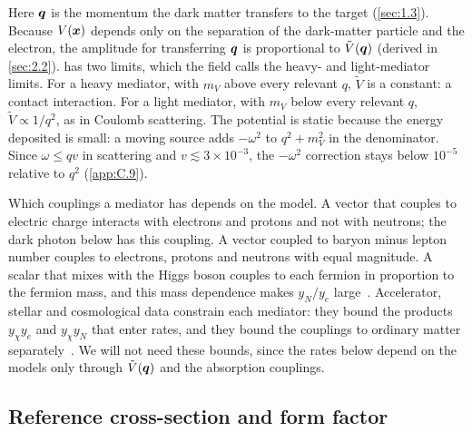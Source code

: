 \noindent Here $\bm{q}$ is the momentum the dark matter transfers to the target (\cref{sec:1.3}). Because $V(\bm{x})$ depends only on the separation of the dark-matter particle and the electron, the amplitude for transferring $\bm{q}$ is proportional to $\tilde V(\bm{q})$ (derived in \cref{sec:2.2}).  has two limits, which the field calls the heavy- and light-mediator limits. For a heavy mediator, with $m_V$ above every relevant $q$, $\tilde V$ is a constant: a contact interaction. For a light mediator, with $m_V$ below every relevant $q$, $\tilde V \propto 1/q^2$, as in Coulomb scattering. The potential is static because the energy deposited is small: a moving source adds $-\omega^2$ to $q^2 + m_V^2$ in the denominator. Since $\omega \le qv$ in scattering and $v \lesssim 3\times10^{-3}$, the $-\omega^2$ correction stays below $10^{-5}$ relative to $q^2$ (\cref{app:C.9}).

Which couplings a mediator has depends on the model. A vector that couples to electric charge interacts with electrons and protons and not with neutrons; the dark photon below has this coupling. A vector coupled to baryon minus lepton number couples to electrons, protons and neutrons with equal magnitude. A scalar that mixes with the Higgs boson couples to each fermion in proportion to the fermion mass, and this mass dependence makes $y_N/y_e$ large~\cite[Sect.~III\,C]{lin2019tasi}. Accelerator, stellar and cosmological data constrain each mediator: they bound the products $y_\chi y_e$ and $y_\chi y_N$ that enter rates, and they bound the couplings to ordinary matter separately~\cite[Sect.~III\,C]{lin2019tasi}. We will not need these bounds, since the rates below depend on the models only through $\tilde V(\bm{q})$ and the absorption couplings.

\subsection{Reference cross-section and form factor}

